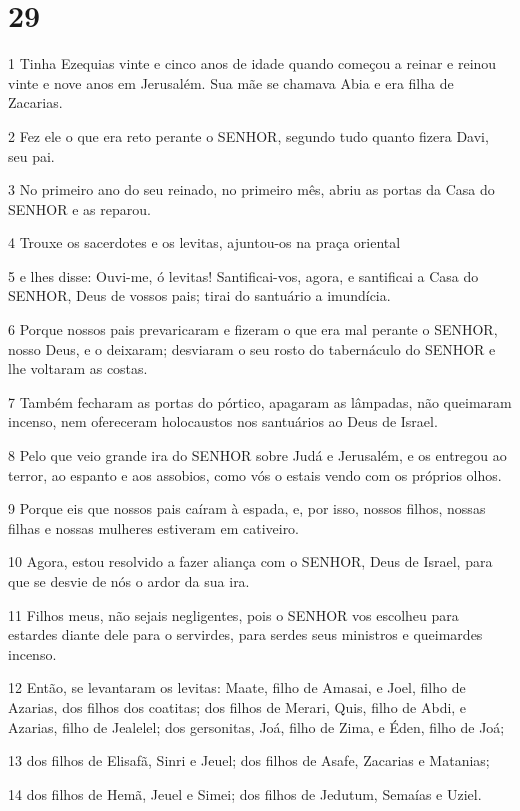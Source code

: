 \chapter{29}

\par 1 Tinha Ezequias vinte e cinco anos de idade quando começou a reinar e reinou vinte e nove anos em Jerusalém. Sua mãe se chamava Abia e era filha de Zacarias.
\par 2 Fez ele o que era reto perante o SENHOR, segundo tudo quanto fizera Davi, seu pai.
\par 3 No primeiro ano do seu reinado, no primeiro mês, abriu as portas da Casa do SENHOR e as reparou.
\par 4 Trouxe os sacerdotes e os levitas, ajuntou-os na praça oriental
\par 5 e lhes disse: Ouvi-me, ó levitas! Santificai-vos, agora, e santificai a Casa do SENHOR, Deus de vossos pais; tirai do santuário a imundícia.
\par 6 Porque nossos pais prevaricaram e fizeram o que era mal perante o SENHOR, nosso Deus, e o deixaram; desviaram o seu rosto do tabernáculo do SENHOR e lhe voltaram as costas.
\par 7 Também fecharam as portas do pórtico, apagaram as lâmpadas, não queimaram incenso, nem ofereceram holocaustos nos santuários ao Deus de Israel.
\par 8 Pelo que veio grande ira do SENHOR sobre Judá e Jerusalém, e os entregou ao terror, ao espanto e aos assobios, como vós o estais vendo com os próprios olhos.
\par 9 Porque eis que nossos pais caíram à espada, e, por isso, nossos filhos, nossas filhas e nossas mulheres estiveram em cativeiro.
\par 10 Agora, estou resolvido a fazer aliança com o SENHOR, Deus de Israel, para que se desvie de nós o ardor da sua ira.
\par 11 Filhos meus, não sejais negligentes, pois o SENHOR vos escolheu para estardes diante dele para o servirdes, para serdes seus ministros e queimardes incenso.
\par 12 Então, se levantaram os levitas: Maate, filho de Amasai, e Joel, filho de Azarias, dos filhos dos coatitas; dos filhos de Merari, Quis, filho de Abdi, e Azarias, filho de Jealelel; dos gersonitas, Joá, filho de Zima, e Éden, filho de Joá;
\par 13 dos filhos de Elisafã, Sinri e Jeuel; dos filhos de Asafe, Zacarias e Matanias;
\par 14 dos filhos de Hemã, Jeuel e Simei; dos filhos de Jedutum, Semaías e Uziel.
